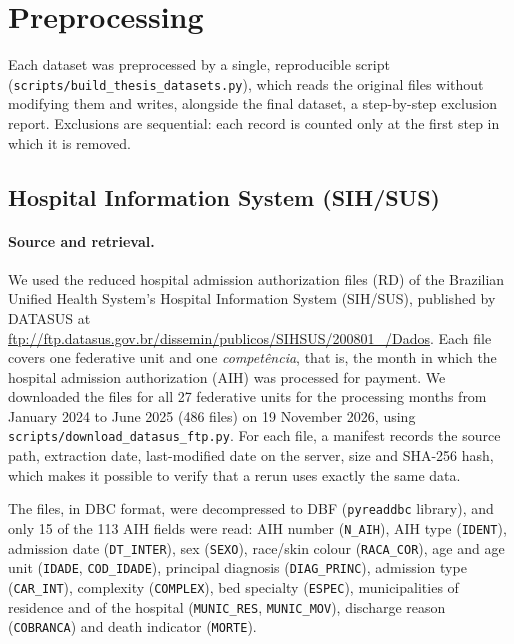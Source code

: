 
\section{Preprocessing}
\label{sec:preprocessing}

Each dataset was preprocessed by a single, reproducible script
(\texttt{scripts/build\_thesis\_datasets.py}), which reads the original files
without modifying them and writes, alongside the final dataset, a step-by-step
exclusion report. Exclusions are sequential: each record is counted only at the
first step in which it is removed.

\subsection{Hospital Information System (SIH/SUS)}
\label{subsec:pre-sih}

\paragraph{Source and retrieval.}
We used the reduced hospital admission authorization files (RD) of the
Brazilian Unified Health System's Hospital Information System (SIH/SUS),
published by DATASUS at
\url{ftp://ftp.datasus.gov.br/dissemin/publicos/SIHSUS/200801_/Dados}. Each file
covers one federative unit and one \emph{competência}, that is, the month in
which the hospital admission authorization (AIH) was processed for payment. We
downloaded the files for all 27 federative units for the processing months
from January 2024 to June 2025 (486 files) on 19 November 2026, using
\texttt{scripts/download\_datasus\_ftp.py}. For each file, a manifest records the
source path, extraction date, last-modified date on the server, size and
SHA-256 hash, which makes it possible to verify that a rerun uses exactly the
same data.

The files, in DBC format, were decompressed to DBF (\texttt{pyreaddbc}
library), and only 15 of the 113 AIH fields were read: AIH number
(\texttt{N\_AIH}), AIH type (\texttt{IDENT}), admission date (\texttt{DT\_INTER}),
sex (\texttt{SEXO}), race/skin colour (\texttt{RACA\_COR}), age and age unit
(\texttt{IDADE}, \texttt{COD\_IDADE}), principal diagnosis (\texttt{DIAG\_PRINC}),
admission type (\texttt{CAR\_INT}), complexity (\texttt{COMPLEX}), bed specialty
(\texttt{ESPEC}), municipalities of residence and of the hospital
(\texttt{MUNIC\_RES}, \texttt{MUNIC\_MOV}), discharge reason (\texttt{COBRANCA})
and death indicator (\texttt{MORTE}).

